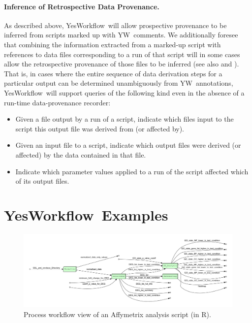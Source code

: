 \documentclass[15]{ijdc-v9}
\newcommand{\YW}{\textsf{YesWorkflow}}
\newcommand{\yw}{\textsf{YW}}
\newcommand{\YWT}{YesWorkflow}
\newcommand{\R}{R}
\begin{document}
\paragraph{Inference of Retrospective Data Provenance.}
As described above, \YW\ will allow prospective provenance to be
inferred from scripts marked up with \yw\ comments.  We additionally
foresee that combining the information extracted from a marked-up
script with references to data files corresponding to a run of that
script will in some cases allow the retrospective provenance of those files to be
inferred (see also  and
). That is, in cases where the entire sequence of data
derivation steps for a particular output can be determined unambiguously from \yw\
annotations, \YW\ will support queries of the following kind even in the absence of a
run-time data-provenance recorder:
\begin{itemize} 
\item Given a file output by a run of a script, indicate which files
  input to the script this output file was derived  from (or affected
  by). 
\item Given an input file to a script, indicate which  output files
  were derived (or affected) by the data contained in that file.
\item Indicate which parameter values applied to a run of the
  script affected which of its output files. 
\end{itemize}



\section{\YWT\ Examples}

 \begin{figure}[t]
   \centering
   \includegraphics[width=.99\textwidth]{figures/Affymetrix_process_whitebox-crop.pdf}
   \caption{Process workflow view of an
     Affymetrix analysis script (in \R).}
   \label{fig-affymetrics}
 \end{figure}
\end{document}
